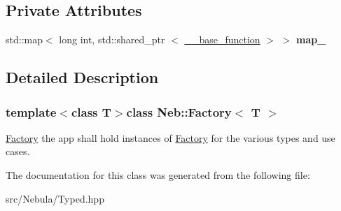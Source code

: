 \subsection*{\-Private \-Attributes}
\begin{DoxyCompactItemize}
\item 
\hypertarget{classNeb_1_1Factory_ac4a797d4d36a2ff4a76c300643b848fe}{std\-::map$<$ long int, \*
std\-::shared\-\_\-ptr\*
$<$ \hyperlink{structNeb_1_1Factory_1_1____base__function}{\-\_\-\-\_\-base\-\_\-function} $>$ $>$ {\bfseries map\-\_\-}}\label{classNeb_1_1Factory_ac4a797d4d36a2ff4a76c300643b848fe}

\end{DoxyCompactItemize}


\subsection{\-Detailed \-Description}
\subsubsection*{template$<$class T$>$class Neb\-::\-Factory$<$ T $>$}

\hyperlink{classNeb_1_1Factory}{\-Factory} the app shall hold instances of \hyperlink{classNeb_1_1Factory}{\-Factory} for the various types and use cases. 

\-The documentation for this class was generated from the following file\-:\begin{DoxyCompactItemize}
\item 
src/\-Nebula/\-Typed.\-hpp\end{DoxyCompactItemize}
